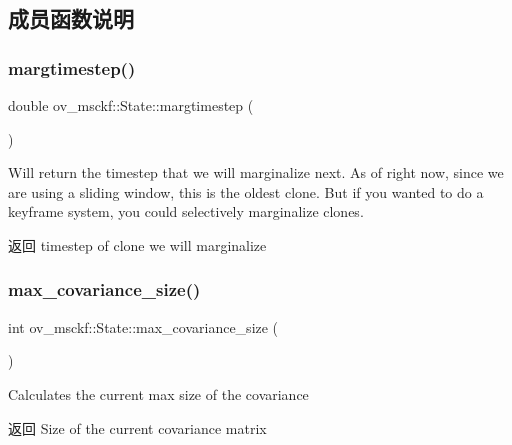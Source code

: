 \subsection{成员函数说明}
\mbox{\label{classov__msckf_1_1State_a36420e71ffa54625667eac2a8a345582}} 
\subsubsection{\texorpdfstring{margtimestep()}{margtimestep()}}
{\footnotesize\ttfamily double ov\+\_\+msckf\+::\+State\+::margtimestep (\begin{DoxyParamCaption}{ }\end{DoxyParamCaption})\hspace{0.3cm}{\ttfamily [inline]}}



Will return the timestep that we will marginalize next. As of right now, since we are using a sliding window, this is the oldest clone. But if you wanted to do a keyframe system, you could selectively marginalize clones. 

\begin{DoxyReturn}{返回}
timestep of clone we will marginalize 
\end{DoxyReturn}
\mbox{\label{classov__msckf_1_1State_a37c45cc1d3d1a3dcc46d3799a997355f}} 
\subsubsection{\texorpdfstring{max\+\_\+covariance\+\_\+size()}{max\_covariance\_size()}}
{\footnotesize\ttfamily int ov\+\_\+msckf\+::\+State\+::max\+\_\+covariance\+\_\+size (\begin{DoxyParamCaption}{ }\end{DoxyParamCaption})\hspace{0.3cm}{\ttfamily [inline]}}



Calculates the current max size of the covariance 

\begin{DoxyReturn}{返回}
Size of the current covariance matrix 
\end{DoxyReturn}
